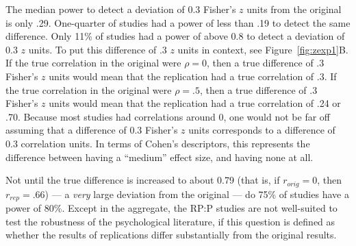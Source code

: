\documentclass[doc,a4paper,floatsintext,draftfirst]{apa6}
\begin{document}
\nocite{Leon:etal:2011}

The median power to detect a deviation of 0.3 Fisher's $z$ units from the original is only .29. One-quarter of studies had a power of less than .19 to detect the same difference. Only 11\% of studies had a power of above 0.8 to detect a deviation of 0.3 $z$ units. To put this difference of .3 $z$ units in context, see Figure~\ref{fig:zexp1}B. If the true correlation in the original were $\rho=0$, then a true difference of .3 Fisher's $z$ units would mean that the replication had a true correlation of .3.  If the true correlation in the original were $\rho=.5$, then a true difference of .3 Fisher's $z$ units would mean that the replication had a true correlation of .24 or .70. Because most studies had correlations around 0, one would not be far off assuming that a difference of 0.3 Fisher's $z$ units corresponds to a difference of 0.3 correlation units. In terms of Cohen's descriptors, this represents the difference between having a ``medium'' effect size, and having none at all.

\nocite{Cohen:1988}

Not until the true difference is increased to about 0.79 (that is, if $r_{orig}=0$, then $r_{rep}=.66$) --- a {\em very} large deviation from the original --- do 75\% of studies have a power of 80\%. Except in the aggregate, the RP:P studies are not well-suited to test the robustness of the psychological literature, if this question is defined as whether the results of replications differ substantially from the original results.
\end{document}
